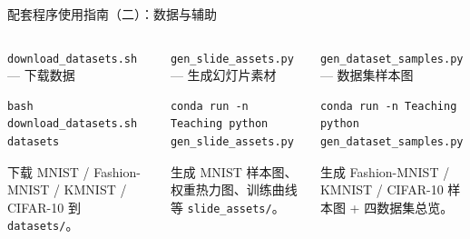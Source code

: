 \documentclass[aspectratio=169]{ctexbeamer}
\begin{document}
\begin{frame}[fragile,shrink=10]{配套程序使用指南（二）：数据与辅助}
\footnotesize

\begin{columns}[T]
\begin{block}{\texttt{download\_datasets.sh} — 下载数据}
\begin{lstlisting}[basicstyle=\ttfamily\scriptsize, frame=none, numbers=none, backgroundcolor=\color{codebg}]
bash download_datasets.sh datasets
\end{lstlisting}
\vspace{-0.35cm}
下载 MNIST / Fashion-MNIST / KMNIST / CIFAR-10 到 \texttt{datasets/}。
\end{block}

\vspace{0.05cm}

\begin{block}{\texttt{gen\_slide\_assets.py} — 生成幻灯片素材}
\begin{lstlisting}[basicstyle=\ttfamily\scriptsize, frame=none, numbers=none, backgroundcolor=\color{codebg}]
conda run -n Teaching python gen_slide_assets.py
\end{lstlisting}
\vspace{-0.35cm}
生成 MNIST 样本图、权重热力图、训练曲线等 \texttt{slide\_assets/}。
\end{block}

\vspace{0.05cm}

\begin{block}{\texttt{gen\_dataset\_samples.py} — 数据集样本图}
\begin{lstlisting}[basicstyle=\ttfamily\scriptsize, frame=none, numbers=none, backgroundcolor=\color{codebg}]
conda run -n Teaching python gen_dataset_samples.py
\end{lstlisting}
\vspace{-0.35cm}
生成 Fashion-MNIST / KMNIST / CIFAR-10 样本图 + 四数据集总览。
\end{block}


\end{columns}
\end{frame}
\end{document}
